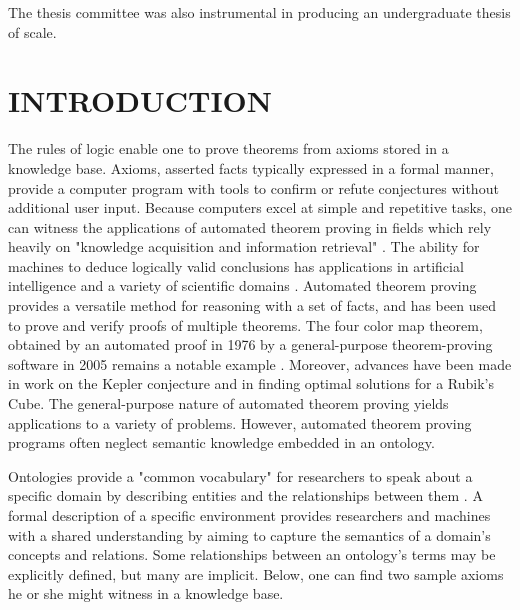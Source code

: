 \documentclass{article}
\begin{document}
The thesis committee was also instrumental in producing an undergraduate thesis of scale.

\newpage
{}
\vspace*{.05in}
\listoffigures

\newpage
{}
\vspace*{.05in}
\listoftables

\newpage
{}
\tableofcontents

\newpage
{}
\setcounter{page}{1}
\vspace*{.05in}
\section{\MakeUppercase{Introduction}}

The rules of logic enable one to prove theorems from axioms stored in a knowledge base. Axioms, asserted facts typically expressed in a formal manner, provide a computer program with tools to confirm or refute conjectures without additional user input. Because computers excel at simple and repetitive tasks, one can witness the applications of automated theorem proving in fields which rely heavily on "knowledge acquisition and information retrieval" \cite{sanchez2012ontology}. The ability for machines to deduce logically valid conclusions has applications in artificial intelligence and a variety of scientific domains \cite{urban2011overview}. Automated theorem proving provides a versatile method for reasoning with a set of facts, and has been used to prove and verify proofs of multiple theorems. The four color map theorem, obtained by an automated proof in 1976 by a general-purpose theorem-proving software in 2005 remains a notable example \cite{gonthier2008formal}. Moreover, advances have been made in work on the Kepler conjecture and in finding optimal solutions for a Rubik's Cube. The general-purpose nature of automated theorem proving yields applications to a variety of problems. However, automated theorem proving programs often neglect semantic knowledge embedded in an ontology.

Ontologies provide a "common vocabulary" for researchers to speak about a specific domain by describing entities and the relationships between them \cite{noy2001ontology}. A formal description of a specific environment provides researchers and machines with a shared understanding by aiming to capture the semantics of a domain's concepts and relations. Some relationships between an ontology's terms may be explicitly defined, but many are implicit. Below, one can find two sample axioms he or she might witness in a knowledge base. 
\end{document}
